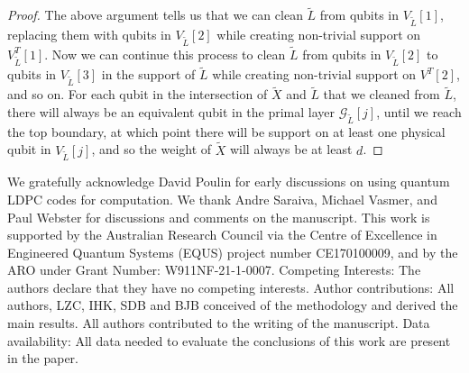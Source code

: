 \documentclass[reprint,
superscriptaddress,
 amsmath,amssymb,
 aps, longbibliography
]{revtex4-1}
\newcommand{\rev}[1]{{#1}}
\begin{document}
\begin{proof}
The above argument tells us that \rev{we can clean $\tilde{L}$ from qubits in  $V_{\tilde{L}}[1]$, replacing them with qubits in $V_{\tilde{L}}[2]$} while creating non-trivial support on $V_{\tilde{L}}^T[1]$. Now we can continue this process to \rev{clean $\tilde{L}$ from qubits in $V_{\tilde{L}}[2]$ to qubits in $V_{\tilde{L}}[3]$ in the support of $\tilde{L}$} while creating non-trivial support on $V^T[2]$, and so on. For each qubit in the intersection of $\tilde{X}$ and $\tilde{L}$ that we \rev{cleaned from $\tilde{L}$}, there will always be an equivalent qubit in the primal layer $\mathcal{G}_{\tilde{L}}[j]$, until we reach the top boundary, at which point there will be support on at least one physical qubit in $V_{\tilde{L}}[j]$, and so the weight of $\tilde{X}$ will always be at least $d$. 
\end{proof}


\begin{acknowledgements}
We gratefully acknowledge David Poulin for early discussions on using quantum LDPC codes for computation.  We thank Andre Saraiva, Michael Vasmer, and Paul Webster for discussions and comments on the manuscript.
This work is supported by the Australian Research Council via the Centre of Excellence in Engineered Quantum Systems (EQUS) project number CE170100009, and by the ARO under Grant Number: W911NF-21-1-0007.  Competing Interests: The authors declare that they have no competing interests.
Author contributions: All authors, LZC, IHK, SDB and BJB conceived of the methodology and derived the main results. All authors contributed to the writing of the manuscript. 
Data availability: All data needed to evaluate the conclusions of this work are present in the paper.
\end{acknowledgements}


\end{document}
